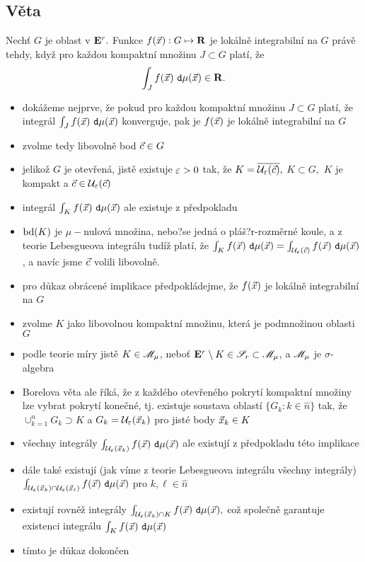 \subsection{Věta}

Nechť $G$ je oblast v ${{\mathbf E}^r}.$ Funkce $f({\vec{x}}):G\mapsto{\mathbf R}$ je lok\'aln\v e integrabiln\'i na $G$ pr\'av\v e tehdy, kdy\v z pro ka\v zdou kompaktn\'i
mno\v zinu $J\subset G$ plat\'i, \v ze
%
$$\int_{J} f({\vec{x}})~\mathtt{d}\mu({\vec{x}})\in{\mathbf R}.$$

\Proof

\begin{itemize}
\item dokážeme nejprve, že pokud pro každou kompaktní množinu $J\subset G$ platí, že integrál $\int_{J} f({\vec{x}})~\mathtt{d}\mu({\vec{x}})$ konverguje, pak je  $f({\vec{x}})$ je lokálně integrabilní na $G$
\item zvolme tedy libovolně bod $\vec{c}\in G$
\item jelikož $G$ je otevřená, jistě existuje $\varepsilon>0$ tak, že $K=\overline{{\mathcal U}_\varepsilon(\vec{c})},$ $K\subset G,$ $K$ je kompakt  a $\vec{c}\in {\mathcal U}_\varepsilon(\vec{c})$
\item integrál $\int_{K} f({\vec{x}})~\mathtt{d}\mu({\vec{x}})$ ale existuje z předpokladu
\item $\mathrm{bd}(K)$ je $\mu-$nulová množina, nebo?se jedná o pláš?r-rozměrné koule, a z teorie Lebesgueova integrálu tudíž platí, že $\int_{K} f({\vec{x}})~\mathtt{d}\mu({\vec{x}})=\int_{{\mathcal U}_\varepsilon(\vec{c})} f({\vec{x}})~\mathtt{d}\mu({\vec{x}})$, a navíc jsme $\vec{c}$ volili libovolně. 
\item pro důkaz obr\'acen\'e implikace p\v redpokl\'adejme, \v ze  $f({\vec{x}})$ je lok\'aln\v e integrabiln\'i na $G$
\item zvolme $K$ jako libovolnou kompaktn\'i množinu, která je podmno\v zinou oblasti $G$
\item podle teorie m\'iry jist\v e $K\in\mathscr{M}_\mu $, nebo\v t ${{\mathbf E}^r} \setminus K \in{\mathscr S}_r\subset\mathscr{M}_\mu $, a $\mathscr{M}_\mu$ je $\sigma$-algebra 
\item Borelova v\v eta ale \v r\'ik\'a, že z ka\v zd\'eho otev\v ren\'eho pokryt\'i kompaktn\'i mno\v ziny lze vybrat pokryt\'i kone\v cn\'e, tj. existuje soustava oblast\'i $\{G_k: k\in \widehat{n}\}$ tak, \v ze $\cup_{k=1}^n G_k \supset K$ a $G_k={\mathcal U}_{\varepsilon}({\vec{x}}_k)$ pro jist\'e body ${\vec{x}}_k\in K$
\item v\v sechny integr\'aly $\int_{{\mathcal U}_\varepsilon({\vec{x}}_k)} f({\vec{x}})~\mathtt{d}\mu({\vec{x}})$ ale existuj\'i z p\v redpokladu t\'eto implikace
\item d\'ale tak\'e existuj\'i (jak v\'ime z teorie Lebesgueova integr\'alu v\v sechny integr\'aly) $\int_{{\mathcal U}_\varepsilon({\vec{x}}_k)\cap {\mathcal U}_\varepsilon({\vec{x}}_\ell)} f({\vec{x}})~\mathtt{d}\mu({\vec{x}})$ pro $k,\ell\in \widehat{n}$
\item existuj\'i rovn\v e\v z integr\'aly $\int_{{\mathcal U}_\varepsilon({\vec{x}}_k) \cap K} f({\vec{x}})~\mathtt{d}\mu({\vec{x}}),$ co\v z spole\v cn\v e garantuje existenci integrálu $\int_{K} f({\vec{x}})~\mathtt{d}\mu({\vec{x}})$
\item tímto je důkaz dokončen
\end{itemize}

